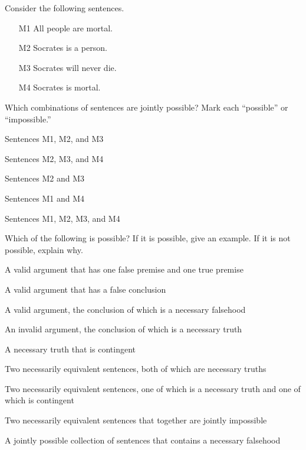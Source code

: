 \begin{practiceproblems}
\problempart Consider the following sentences.
\begin{enumerate}%
\item[M1] \label{itm:allmortal} All people are mortal.
\item[M2] \label{itm:socperson} Socrates is a person.
\item[M3] \label{itm:socnotdie} Socrates will never die.
\item[M4] \label{itm:socmortal} Socrates is mortal.
\end{enumerate}
Which combinations of sentences are jointly possible? Mark each ``possible'' or ``impossible.''
\begin{earg}
\item Sentences M1, M2, and M3
\item Sentences M2, M3, and M4
\item Sentences M2 and M3
\item Sentences M1 and M4
\item Sentences M1, M2, M3, and M4
\end{earg}

\problempart
\label{pr.EnglishCombinations2}
Which of the following is possible? If it is possible, give an example. If it is not possible, explain why.
\begin{earg}
\item A valid argument that has one false premise and one true premise

\item A valid argument that has a false conclusion

\item A valid argument, the conclusion of which is a necessary falsehood

\item An invalid argument, the conclusion of which is a necessary truth

\item A necessary truth that is contingent

\item Two necessarily equivalent sentences, both of which are necessary truths

\item Two necessarily equivalent sentences, one of which is a necessary truth and one of which is contingent

\item Two necessarily equivalent sentences that together are jointly impossible

\item A jointly possible collection of sentences that contains a necessary falsehood


\end{earg}
\end{practiceproblems}
